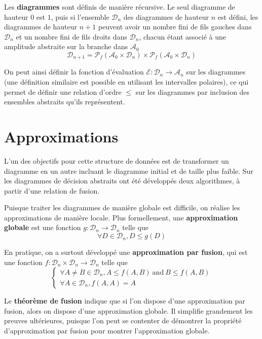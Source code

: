 Les \textbf{diagrammes} sont définis de manière récursive. Le seul diagramme de hauteur 0 est $\boxed 1$, puis si l'ensemble $\mathcal D_n$ des diagrammes de hauteur $n$ est défini, les diagrammes de hauteur $n+1$ peuvent avoir un nombre fini de fils gauches dans $\mathcal D_n$ et un nombre fini de fils droits dans $\mathcal D_n$, chacun étant associé à une amplitude abstraite sur la branche dans $\mathcal A_0$
$$\mathcal{D}_{n+1} = \mathscr{P}_f(\mathcal{A}_0 \times \mathcal{D}_n) \times \mathscr{P}_f(\mathcal{A}_0 \times \mathcal{D}_n)$$

On peut ainsi définir la fonction d'évaluation $\mathcal E : \mathcal D_n \to \mathcal A_n$ sur les diagrammes (une définition similaire est possible en utilisant les intervalles polaires), ce qui permet de définir une relation d'ordre $\le$ sur les diagrammes par inclusion des ensembles abstraits qu'ils représentent.

\section{Approximations}

L'un des objectifs pour cette structure de données est de transformer un diagramme en un autre incluant le diagramme initial et de taille plus faible. Sur les diagrammes de décision abstraits ont été développés deux algorithmes, à partir d'une relation de fusion.

Puisque traiter les diagrammes de manière globale est difficile, on réalise les approximations de manière locale. Plus formellement, une \textbf{approximation globale} est une fonction $g : \mathcal D_n \to \mathcal D_n$ telle que
$$\forall D \in \mathcal D_n, D \le g(D)$$

En pratique, on a surtout développé une \textbf{approximation par fusion}, qui est une fonction $f : \mathcal D_n \times \mathcal D_n \rightarrow \mathcal D_n$ telle que
$$\begin{cases}
  \forall A \not= B \in \mathcal{D}_n, A \le f(A, B)~\text{and}~B \le f(A, B) \\
  \forall A \in \mathcal{D}_n, f(A, A) = A
\end{cases}
$$

Le \textbf{théorème de fusion} indique que si l'on dispose d'une approximation par fusion, alors on dispose d'une approximation globale. Il simplifie grandement les preuves ultérieures, puisque l'on peut se contenter de démontrer la propriété d'approximation par fusion pour montrer l'approximation globale.

